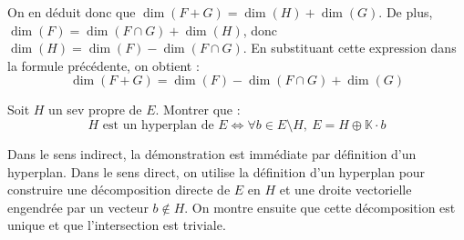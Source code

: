 \documentclass[11pt, a4paper]{article}
\theoremstyle{definition}
\begin{document}
On en déduit donc que $\dim(F+G) = \dim(H) + \dim(G)$. De plus, $\dim(F) = \dim(F \cap G) + \dim(H)$, donc $\dim(H) = \dim(F) - \dim(F \cap G)$. En substituant cette expression dans la formule précédente, on obtient :
\[
\dim(F+G) = \dim(F) - \dim(F \cap G) + \dim(G)
\]

\clearpage

\begin{tcolorbox}[instructionstyle]
Soit $H$ un sev propre de $E$. Montrer que :
\[
H \text{ est un hyperplan de } E \iff \forall b \in E \setminus H, \ E = H \oplus \mathbb{K} \cdot b
\]
\end{tcolorbox}

\begin{tcolorbox}[methodstyle]
	Dans le sens indirect, la démonstration est immédiate par définition d'un hyperplan. Dans le sens direct, on utilise la définition d'un hyperplan pour construire une décomposition directe de $E$ en $H$ et une droite vectorielle engendrée par un vecteur $b \notin H$. On montre ensuite que cette décomposition est unique et que l'intersection est triviale.
\end{tcolorbox}
\end{document}
